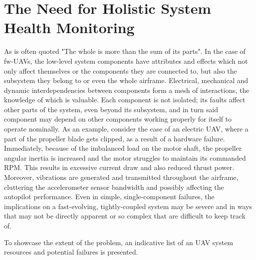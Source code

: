 \chapter{The Need for Holistic System Health Monitoring}

As is often quoted "The whole is more than the sum of its parts". In the case of fw-UAVs, the low-level system components have attributes and effects which not only affect themselves or the components they are connected to, but also the subsystem they belong to or even the whole airframe. Electrical, mechanical and dynamic interdependencies between components form a mesh of interactions, the knowledge of which is valuable. Each component is not isolated; its faults affect other parts of the system, even beyond its subsystem, and in turn said component may depend on other components working properly for itself to operate nominally. As an example, consider the case of an electric UAV, where a part of the propeller blade gets clipped, as a result of a hardware failure. Immediately, because of the imbalanced load on the motor shaft, the propeller angular inertia is increased and the motor struggles to maintain its commanded RPM. This results in excessive current draw and also reduced thrust power. Moreover, vibrations are generated and transmitted throughout the airframe, cluttering the accelerometer sensor bandwidth and possibly affecting the autopilot performance. Even in simple, single-component failures, the implications on a fast-evolving, tightly-coupled system may be severe and in ways that may not be directly apparent or so complex that are difficult to keep track of.

To showcase the extent of the problem, an indicative list of an UAV system resources and potential failures is presented.

